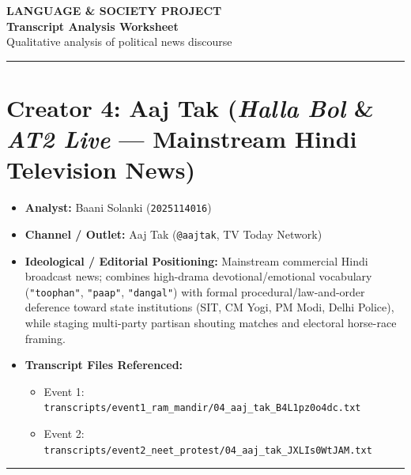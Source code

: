 \documentclass[10pt,a4paper]{article}
\begin{document}
\clearpage

\begin{center}
    {\large\bfseries LANGUAGE \& SOCIETY PROJECT}\\[3pt]
    {\LARGE\bfseries Transcript Analysis Worksheet}\\[3pt]
    {\normalsize Qualitative analysis of political news discourse}
\end{center}
\vspace{2pt}
\noindent\rule{\textwidth}{0.4pt}
\vspace{4pt}


\section*{Creator 4: Aaj Tak (\textit{Halla Bol} \& \textit{AT2 Live} --- Mainstream Hindi Television News)}
\begin{itemize}[leftmargin=1.5em, itemsep=3pt, topsep=4pt]
  \item \textbf{Analyst:} Baani Solanki (\texttt{2025114016})
  \item \textbf{Channel / Outlet:} Aaj Tak (\texttt{@aajtak}, TV Today Network)
  \item \textbf{Ideological / Editorial Positioning:} Mainstream commercial Hindi broadcast news; combines high-drama devotional/emotional vocabulary (\texttt{"toophan"}, \texttt{"paap"}, \texttt{"dangal"}) with formal procedural/law-and-order deference toward state institutions (SIT, CM Yogi, PM Modi, Delhi Police), while staging multi-party partisan shouting matches and electoral horse-race framing.
  \item \textbf{Transcript Files Referenced:}
  \begin{itemize}[leftmargin=1.4em, itemsep=2pt, topsep=2pt]
    \item Event 1: \texttt{transcripts/event1\_ram\_mandir/04\_aaj\_tak\_B4L1pz0o4dc.txt}
    \item Event 2: \texttt{transcripts/event2\_neet\_protest/04\_aaj\_tak\_JXLIs0WtJAM.txt}
  \end{itemize}
\end{itemize}
\vspace{4pt}\noindent\rule{\textwidth}{0.4pt}\vspace{4pt}
\end{document}
